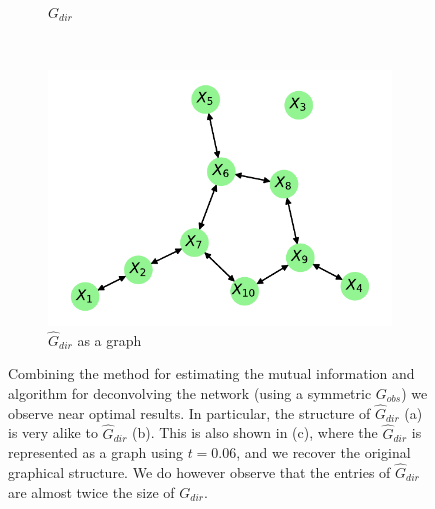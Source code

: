 \documentclass[../Thesis.tex]{subfiles}
\begin{document}
\begin{figure}[H]
\begin{subfigure}[t]{0.49\linewidth}
        \caption{$G_{dir}$}
    \end{subfigure}
    \\[\baselineskip]
    \begin{subfigure}[t]{0.49\linewidth}
        \includegraphics[width = \linewidth]{figures/ND examples/Gaussian network 10 - G_dir as graph - symmetric.pdf}
        \caption{$\hat{G}_{dir}$ as a graph}
    \end{subfigure}
    \caption{Combining the method for estimating the mutual information and algorithm for deconvolving the network (using a symmetric $G_{obs}$) we observe near optimal results. In particular, the structure of $\hat{G}_{dir}$ (a) is very alike to $\hat{G}_{dir}$ (b). This is also shown in (c), where the $\hat{G}_{dir}$ is represented as a graph using $t = 0.06$, and we recover the original graphical structure. We do however observe that the entries of $\hat{G}_{dir}$ are almost twice the size of $G_{dir}$.}
    \label{fig:estimated MI 10 Gaussian results}
\end{figure}
\end{document}
